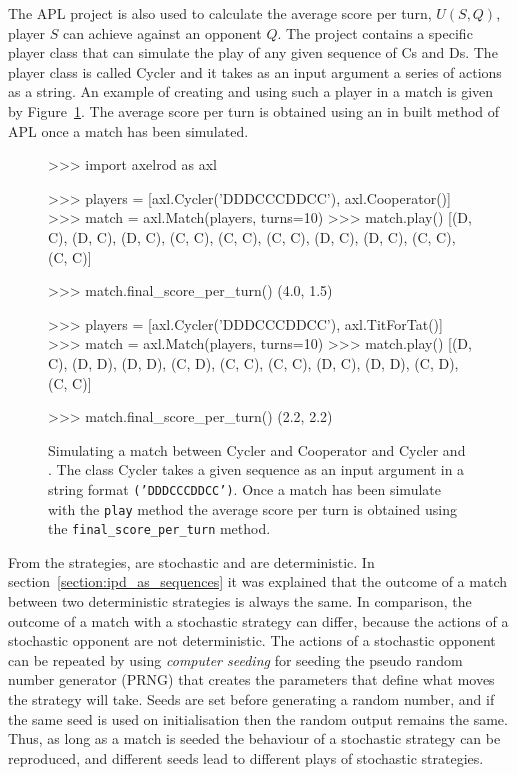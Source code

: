The APL project is also used to calculate the average score per turn, \(U(S, Q)\),
player \(S\) can achieve against an opponent \(Q\). The project contains a specific
player
class that can simulate the play of any given sequence of Cs and Ds. The player class
is called Cycler and it takes as an input argument a series of actions as a
string.
An example of creating and using such a player in a match is given by
Figure~\ref{fig:apl_simulations_cycler}. The average score per turn is obtained
using an in built method of APL once a match has been simulated.

\begin{figure}[!htbp]
    \begin{usagepy}
>>> import axelrod as axl

>>> players = [axl.Cycler('DDDCCCDDCC'), axl.Cooperator()]
>>> match = axl.Match(players, turns=10)
>>> match.play()
[(D, C), (D, C), (D, C), (C, C), (C, C), (C, C), (D, C), (D, C), (C, C), (C, C)]

>>> match.final_score_per_turn()
(4.0, 1.5)

>>> players = [axl.Cycler('DDDCCCDDCC'), axl.TitForTat()]
>>> match = axl.Match(players, turns=10)
>>> match.play()
[(D, C), (D, D), (D, D), (C, D), (C, C), (C, C), (D, C), (D, D), (C, D), (C, C)]

>>> match.final_score_per_turn()
(2.2, 2.2)

\end{usagepy}
\caption{Simulating a match between Cycler and Cooperator and Cycler and \TitForTat.
The class Cycler takes a given sequence as an input argument in a string format
\texttt{('DDDCCCDDCC')}. Once a match has been simulate with the \texttt{play} method
the average score per turn is obtained using the \texttt{final_score_per_turn}
method.}\label{fig:apl_simulations_cycler}
\end{figure}

From the \numberofstrategiesbestsequences strategies, \stochasticstrategies are stochastic and
\deterministicstrategies are deterministic. In section~\ref{section:ipd_as_sequences} it was explained
that the outcome of a match between two deterministic strategies is always the same.
In comparison, the outcome of a match with a stochastic strategy can
differ, because the actions of a stochastic opponent are not deterministic.
The actions of a stochastic opponent can be repeated by using
\textit{computer seeding} for seeding the pseudo random number generator (PRNG) that creates the
parameters that define what moves the strategy will take. Seeds are set before
generating a random number, and if the same seed is used on initialisation then
the random output remains the same. Thus, as long as a match is seeded the
behaviour of a stochastic strategy can be reproduced, and different seeds lead
to different plays of stochastic strategies.

